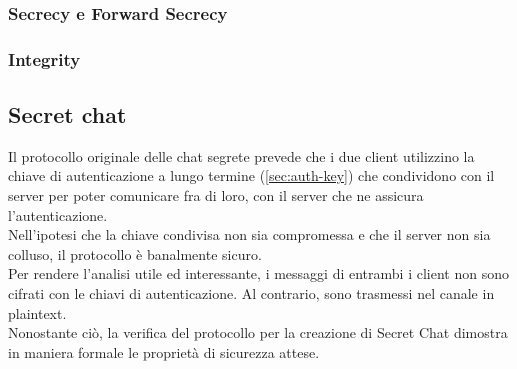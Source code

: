\subsubsection{Secrecy e Forward Secrecy}







\subsubsection{Integrity}






\subsection{Secret chat}
Il protocollo originale delle chat segrete prevede che i due client utilizzino la chiave di autenticazione a lungo termine (\autoref{sec:auth-key}) che condividono con il server
per poter comunicare fra di loro, con il server che ne assicura l'autenticazione. \\
Nell'ipotesi che la chiave condivisa non sia compromessa e che il server non sia colluso, il protocollo è banalmente sicuro. \\
Per rendere l'analisi utile ed interessante, i messaggi di entrambi i client non sono cifrati con le chiavi di autenticazione.
Al contrario, sono trasmessi nel canale in plaintext. \\
Nonostante ciò, la verifica del protocollo per la creazione di Secret Chat dimostra in maniera formale le proprietà di sicurezza attese. \\

